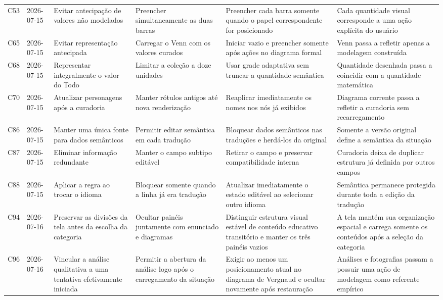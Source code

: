 \begin{landscape}
\begin{longtable}{p{1.0cm}p{1.9cm}p{4.0cm}p{5.0cm}p{6.2cm}p{5.7cm}}
\addlinespace[2pt]
C53 & 2026-07-15 & Evitar antecipação de valores não modelados & Preencher simultaneamente as duas barras & Preencher cada barra somente quando o papel correspondente for posicionado & Cada quantidade visual corresponde a uma ação explícita do usuário \\
\addlinespace[2pt]
C65 & 2026-07-15 & Evitar representação antecipada & Carregar o Venn com os valores curados & Iniciar vazio e preencher somente após ações no diagrama formal & Venn passa a refletir apenas a modelagem construída \\
\addlinespace[2pt]
C68 & 2026-07-15 & Representar integralmente o valor do Todo & Limitar a coleção a doze unidades & Usar grade adaptativa sem truncar a quantidade semântica & Quantidade desenhada passa a coincidir com a quantidade matemática \\
\addlinespace[2pt]
C70 & 2026-07-15 & Atualizar personagens após a curadoria & Manter rótulos antigos até nova renderização & Reaplicar imediatamente os nomes nos nós já exibidos & Diagrama corrente passa a refletir a curadoria sem recarregamento \\
\addlinespace[2pt]
C86 & 2026-07-15 & Manter uma única fonte para dados semânticos & Permitir editar semântica em cada tradução & Bloquear dados semânticos nas traduções e herdá-los da original & Somente a versão original define a semântica da situação \\
\addlinespace[2pt]
C87 & 2026-07-15 & Eliminar informação redundante & Manter o campo subtipo editável & Retirar o campo e preservar compatibilidade interna & Curadoria deixa de duplicar estrutura já definida por outros campos \\
\addlinespace[2pt]
C88 & 2026-07-15 & Aplicar a regra ao trocar o idioma & Bloquear somente quando a linha já era tradução & Atualizar imediatamente o estado editável ao selecionar outro idioma & Semântica permanece protegida durante toda a edição da tradução \\
\addlinespace[2pt]
C94 & 2026-07-16 & Preservar as divisões da tela antes da escolha da categoria & Ocultar painéis juntamente com enunciado e diagramas & Distinguir estrutura visual estável de conteúdo educativo transitório e manter os três painéis vazios & A tela mantém sua organização espacial e carrega somente os conteúdos após a seleção da categoria \\
\addlinespace[2pt]
C96 & 2026-07-16 & Vincular a análise qualitativa a uma tentativa efetivamente iniciada & Permitir a abertura da análise logo após o carregamento da situação & Exigir ao menos um posicionamento atual no diagrama de Vergnaud e ocultar novamente após restauração & Análises e fotografias passam a possuir uma ação de modelagem como referente empírico \\

\end{longtable}
\end{landscape}
